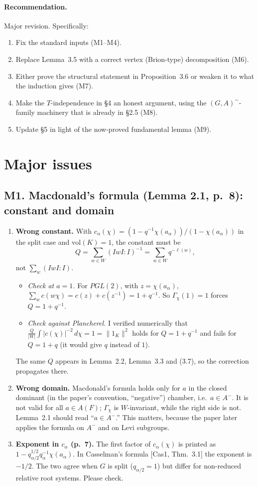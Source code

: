 \documentclass[11pt]{article}
\begin{document}
\paragraph{Recommendation.} Major revision. Specifically:
\begin{enumerate}
\item Fix the standard inputs (M1--M4).
\item Replace Lemma~3.5 with a correct vertex (Brion-type) decomposition (M6).
\item Either prove the structural statement in Proposition~3.6 or weaken it to what the induction gives (M7).
\item Make the $T$-independence in \S4 an honest argument, using the $(G,A)^\sim$-family machinery that is already in \S2.5 (M8).
\item Update \S5 in light of the now-proved fundamental lemma (M9).
\end{enumerate}

\section{Major issues}

\subsection*{M1. Macdonald's formula (Lemma 2.1, p.~8): constant and domain}
\begin{enumerate}[label=(\alph*)]
\item \textbf{Wrong constant.} With $c_\alpha(\chi)=(1-q^{-1}\chi(a_\alpha))/(1-\chi(a_\alpha))$ in the split case and $\mathrm{vol}(K)=1$, the constant must be
\[ Q=\sum_{w\in W}(IwI:I)^{-1}=\sum_{w\in W}q^{-\ell(w)},\]
not $\sum_w (IwI:I)$.
\begin{itemize}
\item \emph{Check at $a=1$.} For $PGL(2)$, with $z=\chi(a_\alpha)$, $\sum_w c(w\chi)=c(z)+c(z^{-1})=1+q^{-1}$. So $\Gamma_\chi(1)=1$ forces $Q=1+q^{-1}$.
\item \emph{Check against Plancherel.} I verified numerically that $\frac{Q}{|W|}\int|c(\chi)|^{-2}\,d\chi=1=\|1_K\|^2$ holds for $Q=1+q^{-1}$ and fails for $Q=1+q$ (it would give $q$ instead of $1$).
\end{itemize}
The same $Q$ appears in Lemma~2.2, Lemma~3.3 and (3.7), so the correction propagates there.
\item \textbf{Wrong domain.} Macdonald's formula holds only for $a$ in the closed dominant (in the paper's convention, ``negative'') chamber, i.e.\ $a\in A^-$. It is not valid for all $a\in A(F)$; $\Gamma_\chi$ is $W$-invariant, while the right side is not. Lemma~2.1 should read ``$a\in A^-$.'' This matters, because the paper later applies the formula on $A^-$ and on Levi subgroups.
\item \textbf{Exponent in $c_\alpha$ (p.~7).} The first factor of $c_\alpha(\chi)$ is printed as $1-q_{\alpha/2}^{1/2}q_\alpha^{-1}\chi(a_\alpha)$. In Casselman's formula [Cas1, Thm.~3.1] the exponent is $-1/2$. The two agree when $G$ is split ($q_{\alpha/2}=1$) but differ for non-reduced relative root systems. Please check.
\end{enumerate}
\end{document}
